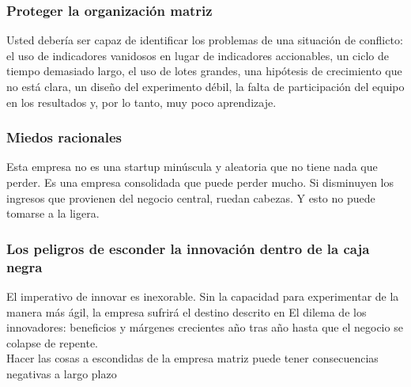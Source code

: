\documentclass[10pt]{article}
\begin{document}
\begin{multicols}{2}
\subsubsection*{Proteger la organización matriz}
Usted debería ser capaz de identificar los problemas de una situación de conflicto: el uso de indicadores vanidosos en lugar de indicadores accionables, un ciclo de tiempo demasiado largo, el uso de lotes grandes, una hipótesis de crecimiento que no está clara, un diseño del experimento débil, la falta de participación del equipo en los resultados y, por lo tanto, muy poco aprendizaje.
\subsubsection*{Miedos racionales}
Esta empresa no es una startup minúscula y aleatoria que no tiene nada que perder. Es una empresa consolidada que puede perder mucho. Si disminuyen los ingresos que provienen del negocio central, ruedan cabezas. Y esto no puede tomarse a la ligera.
\subsubsection*{Los peligros de esconder la innovación dentro de la caja negra}
El imperativo de innovar es inexorable. Sin la capacidad para experimentar de la manera más ágil, la empresa sufrirá el destino descrito en El dilema de los innovadores: beneficios y márgenes crecientes año tras año hasta que el negocio se colapse de repente.\\
Hacer las cosas a escondidas de la empresa matriz puede tener consecuencias negativas a largo plazo

\end{multicols}
\end{document}
